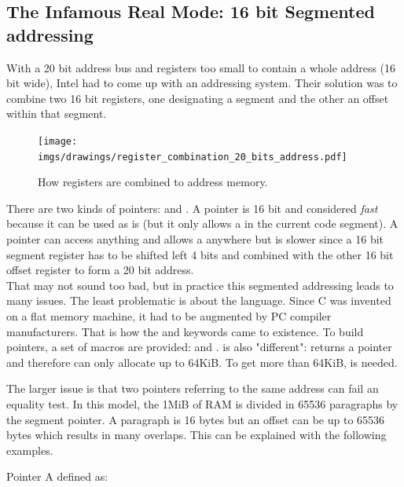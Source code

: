 \documentclass[book.tex]{subfiles}
\begin{document}
\subsection{The Infamous Real Mode: 16 bit Segmented addressing}
With a 20 bit address bus and registers too small to contain a whole address (16 bit wide), Intel had to come up with an addressing system. Their solution was to combine two 16 bit registers, one designating a segment and the other an offset within that segment.\\
\par
\begin{figure}[H]
\centering
\texttt{[image: imgs/drawings/register\_combination\_20\_bits\_address.pdf]}
\caption{How registers are combined to address memory.}
\label{fig:register_comb_to_20_bits}
\end{figure}
\par
There are two kinds of pointers:  and . A  pointer is 16 bit and considered \emph{fast} because it can be used as is (but it only allows a  in the current code segment). A  pointer can access anything and allows a  anywhere but is slower since a 16 bit segment register has to be shifted left 4 bits and combined with the other 16 bit offset register to form a 20 bit address.\\

That may not sound too bad, but in practice this segmented addressing leads to many issues.
The least problematic is about the language. Since C was invented on a flat memory machine, it had to be augmented by PC compiler manufacturers. That is how the  and  keywords came to existence. To build pointers, a set of macros are provided:  and .  is also "different":  returns a  pointer and therefore can only allocate up to 64KiB. To get more than 64KiB,  is needed.\\
\par
The larger issue is that two pointers referring to the same address can fail an equality test. In this model, the 1MiB of RAM is divided in 65536 paragraphs by the segment pointer. A paragraph is 16 bytes but an offset can be up to 65536 bytes which results in many overlaps. This can be explained with the following examples.\\
\par
Pointer A defined as:\\
\par
\begin{minipage}{\textwidth}

\end{minipage}
\end{document}

